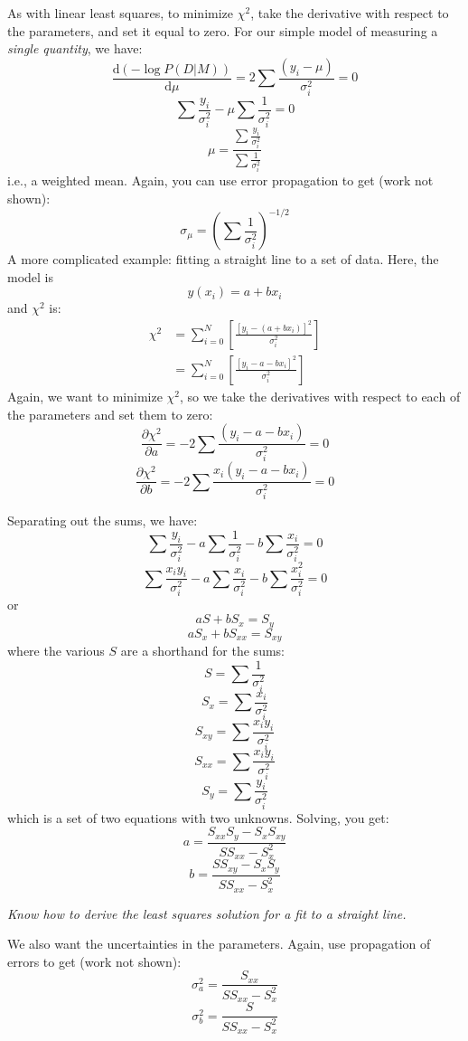 \documentclass{article}
\newcommand{\test}[1]{%
    \begin{center}
        \colorbox{hl}{\parbox{0.9\textwidth}{\emph{#1}}}
    \end{center}}
\begin{document}
As with linear least squares, to minimize $\chi^{2}$, take the derivative
with respect to the parameters, and set it equal to zero.
For our simple model of measuring a \emph{single quantity}, we have:
$$ \frac{\mathrm{d}(-\log P(D|M))}{\mathrm{d}\mu} =
    2\sum\frac{(y_{i}-\mu)}{\sigma_i^2} = 0
$$
$$ \sum\frac{y_i}{\sigma_i^2} - \mu\sum\frac{1}{\sigma_i^2} = 0
$$
$$ \mu = \frac{\sum\frac{y_i}{\sigma_i^2}}{\sum\frac{1}{\sigma_i^2}}
$$
i.e., a weighted mean. Again, you can use error
propagation to get (work not shown):
$$ \sigma_{\mu} = \left(\sum\frac{1}{\sigma_i^2}\right)^{-1/2}
$$
A more complicated example: fitting a straight line to a set of data.
Here, the model is
$$
    y(x_i) = a + bx_i
$$
and $\chi^2$ is:
\begin{align*}
    \chi^2 &= \sum_{i=0}^{N}\left[\frac{\left[y_i-(a+bx_i)\right]^2}{\sigma_i^2}\right]\\
           &= \sum_{i=0}^{N}\left[\frac{\left[y_i-a-bx_i\right]^2}{\sigma_i^2}\right]
\end{align*}
Again, we want to minimize $\chi^2$, so we take the derivatives with respect
to each of the parameters and set them to zero:
$$  \frac{\partial\chi^{2}}{\partial{a}} =
    -2\sum\frac{(y_i-a-bx_i)}{\sigma_i^2} = 0 $$
$$  \frac{\partial\chi^{2}}{\partial{b}} =
    -2\sum\frac{x_i(y_i-a-bx_i)}{\sigma_i^2} = 0 $$

Separating out the sums, we have:
$$  \sum\frac{y_i}{\sigma_i^2} -
   a\sum\frac{1}{\sigma_i^2} -
    b\sum\frac{x_i}{\sigma_i^2} = 0 $$
$$  \sum\frac{x_iy_i}{\sigma_i^2} -
    a\sum\frac{x_i}{\sigma_i^2} -
    b\sum\frac{x_i^2}{\sigma_i^2} = 0 $$
or
    $$ aS + bS_{x} = S_{y} $$
    $$ aS_{x} + bS_{xx} = S_{xy} $$
where the various $S$ are a shorthand for the sums:
    $$ S = \sum\frac{1}{\sigma_i^2}  $$
    $$ S_{x} = \sum\frac{x_i}{\sigma_i^2}  $$
    $$ S_{xy} = \sum\frac{x_iy_i}{\sigma_i^2}  $$
    $$ S_{xx} = \sum\frac{x_iy_i}{\sigma_i^2}  $$
    $$ S_{y} = \sum\frac{y_i}{\sigma_i^2}  $$
which is a set of two equations with two unknowns. Solving, you get:
$$ a = \frac{S_{xx}S_{y} - S_{x}S_{xy}}{SS_{xx} - S_{x}^{2}}  $$
$$ b = \frac{SS_{xy} - S_{x}S_{y}}{SS_{xx} - S_{x}^{2}}  $$

\test{Know how to derive the least squares solution for a fit to a straight
line.}

We also want the uncertainties in the parameters.
Again, use propagation of errors to get (work not shown):
$$ \sigma_a^2 = \frac{S_{xx}}{SS_{xx}-S_x^2}   $$
$$ \sigma_b^2 = \frac{S}{SS_{xx}-S_x^2}   $$
\end{document}

